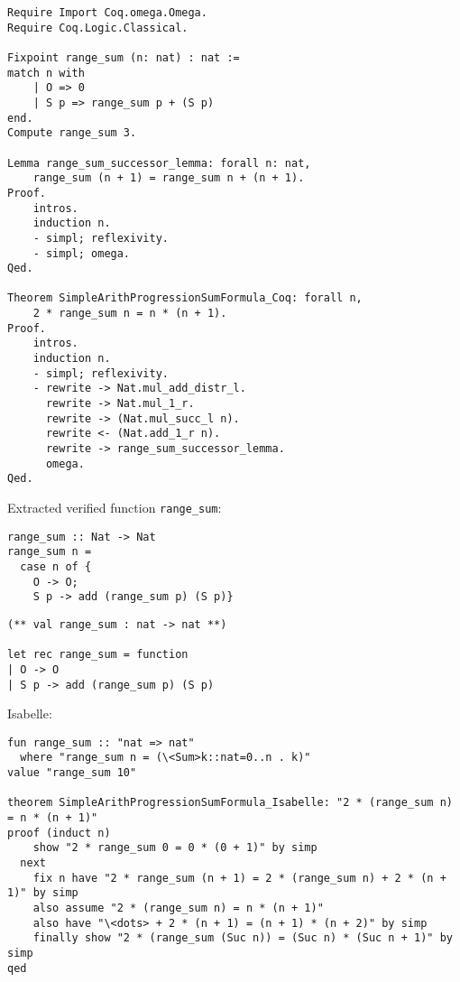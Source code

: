 \documentclass[article]{aaltoseries}
\begin{document}
\begin{lstlisting}[language=coq]
Require Import Coq.omega.Omega.
Require Coq.Logic.Classical.

Fixpoint range_sum (n: nat) : nat :=
match n with
    | O => 0
    | S p => range_sum p + (S p)
end.
Compute range_sum 3.

Lemma range_sum_successor_lemma: forall n: nat,
    range_sum (n + 1) = range_sum n + (n + 1).
Proof.
    intros.
    induction n.
    - simpl; reflexivity.
    - simpl; omega.
Qed.

Theorem SimpleArithProgressionSumFormula_Coq: forall n,
    2 * range_sum n = n * (n + 1).
Proof.
    intros.
    induction n.
    - simpl; reflexivity.
    - rewrite -> Nat.mul_add_distr_l.
      rewrite -> Nat.mul_1_r.
      rewrite -> (Nat.mul_succ_l n).
      rewrite <- (Nat.add_1_r n).
      rewrite -> range_sum_successor_lemma.
      omega.
Qed.
\end{lstlisting}



Extracted verified function \texttt{range\_sum}:


\begin{minipage}{.45\columnwidth}
\begin{lstlisting}[caption={Extracted function in Haskell},frame=none]
range_sum :: Nat -> Nat
range_sum n =
  case n of {
    O -> O;
    S p -> add (range_sum p) (S p)}
\end{lstlisting}
\end{minipage}
\begin{minipage}{.45\columnwidth}
\begin{lstlisting}[caption={Extracted function in OCaml},frame=none]
(** val range_sum : nat -> nat **)

let rec range_sum = function
| O -> O
| S p -> add (range_sum p) (S p)
\end{lstlisting}
\end{minipage}
\vspace{3pt}

Isabelle:

\begin{lstlisting}[language=isabelle]
fun range_sum :: "nat => nat"
  where "range_sum n = (\<Sum>k::nat=0..n . k)"
value "range_sum 10"

theorem SimpleArithProgressionSumFormula_Isabelle: "2 * (range_sum n) = n * (n + 1)"
proof (induct n)
    show "2 * range_sum 0 = 0 * (0 + 1)" by simp
  next
    fix n have "2 * range_sum (n + 1) = 2 * (range_sum n) + 2 * (n + 1)" by simp
    also assume "2 * (range_sum n) = n * (n + 1)"
    also have "\<dots> + 2 * (n + 1) = (n + 1) * (n + 2)" by simp
    finally show "2 * (range_sum (Suc n)) = (Suc n) * (Suc n + 1)" by simp
qed
\end{lstlisting}
\end{document}

